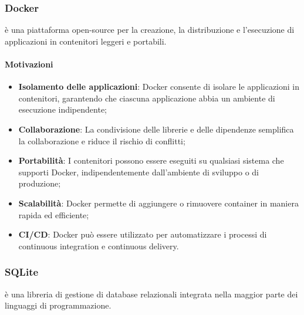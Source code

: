 \subsubsection{Docker}\label{sec:docker}
\par {} è una piattaforma open-source per la creazione, la distribuzione e l'esecuzione di applicazioni in contenitori leggeri e portabili.
\paragraph*{Motivazioni}
\begin{itemize}
  \item \textbf{Isolamento delle applicazioni}: Docker consente di isolare le applicazioni in contenitori, garantendo che ciascuna applicazione abbia un ambiente di esecuzione indipendente;
  \item \textbf{Collaborazione}: La condivisione delle librerie e delle dipendenze semplifica la collaborazione e riduce il rischio di conflitti;
  \item \textbf{Portabilità}: I contenitori possono essere eseguiti su qualsiasi sistema che supporti Docker, indipendentemente dall'ambiente di sviluppo o di produzione;
  \item \textbf{Scalabilità}: Docker permette di aggiungere o rimuovere container in maniera rapida ed efficiente;
  \item \textbf{CI/CD}: Docker può essere utilizzato per automatizzare i processi di continuous integration e continuous delivery.
\end{itemize}

\subsubsection{SQLite}\label{sec:SQLite}
\par {} è una libreria di gestione di database relazionali integrata nella maggior parte dei linguaggi di programmazione.
